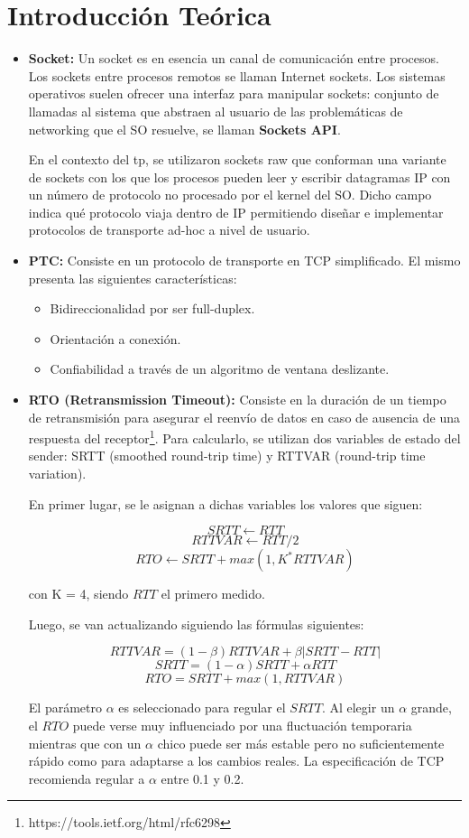 \documentclass[10pt, a4paper]{article}
\begin{document}
\section{Introducción Teórica}
\begin{itemize}

\item \textbf{Socket:} Un socket es en esencia un canal de comunicación entre procesos. Los sockets entre procesos remotos se llaman Internet sockets. Los sistemas operativos suelen ofrecer una interfaz para manipular sockets: conjunto de llamadas al sistema que abstraen al usuario de las problemáticas de networking que el SO resuelve, se llaman \textbf{Sockets API}.

En el contexto del tp, se utilizaron sockets raw que conforman una variante de sockets con los que los procesos pueden leer y escribir datagramas IP con un número de protocolo no procesado por el kernel del SO. Dicho campo indica qué protocolo viaja dentro de IP permitiendo diseñar e implementar protocolos de transporte ad-hoc a nivel de usuario.

\item \textbf{PTC:} Consiste en un protocolo de transporte en TCP simplificado. El mismo presenta las siguientes características:
\begin{itemize} 
\item Bidireccionalidad por ser full-duplex.
\item Orientación a conexión.
\item Confiabilidad a través de un algoritmo de ventana deslizante.
\end{itemize}

\item \textbf{RTO (Retransmission Timeout):} Consiste en la duración de un tiempo de retransmisión para asegurar el reenvío de datos en caso de ausencia de una respuesta del receptor\footnote{https://tools.ietf.org/html/rfc6298}. Para calcularlo, se utilizan dos variables de estado del sender: SRTT (smoothed round-trip time) y RTTVAR (round-trip time variation).

En primer lugar, se le asignan a dichas variables los valores que siguen:

			$$SRTT \leftarrow RTT$$
            $$RTTVAR \leftarrow RTT/2$$
            $$RTO \leftarrow SRTT + max(1, K^*RTTVAR)$$
            
con K = 4, siendo $RTT$ el primero medido.

Luego, se van actualizando siguiendo las fórmulas siguientes:

$$RTTVAR = (1 - \beta) RTTVAR + \beta |SRTT - RTT|$$
$$SRTT = (1 - \alpha)SRTT + \alpha RTT$$
$$RTO = SRTT + max(1, RTTVAR)$$

El parámetro $\alpha$ es seleccionado para regular el $SRTT$. Al elegir un $\alpha$ grande, el $RTO$ puede verse muy influenciado por una fluctuación temporaria mientras que con un $\alpha$ chico puede ser más estable pero no suficientemente rápido como para adaptarse a los cambios reales. La especificación de TCP recomienda regular a $\alpha$ entre 0.1 y 0.2.
\end{itemize}
\end{document}
